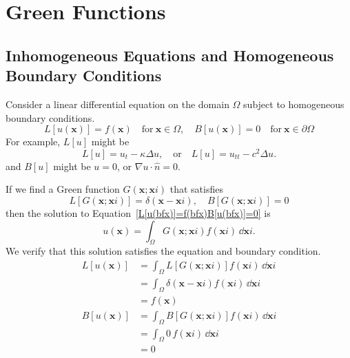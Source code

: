 \flushbottom




\chapter{Green Functions}




\section{Inhomogeneous Equations and Homogeneous Boundary Conditions}

Consider a linear differential equation on the domain $\Omega$
subject to homogeneous boundary conditions.
\begin{equation}
  \label{L[u(bfx)]=f(bfx)B[u(bfx)]=0}
  L[u(\mathbf{x})] = f(\mathbf{x}) \quad \mathrm{for}\ \mathbf{x} \in \Omega, \quad
  B[u(\mathbf{x})] = 0 \quad \mathrm{for}\ \mathbf{x} \in \partial \Omega
\end{equation}
For example, $L[u]$ might be
\[ 
L[u] = u_t - \kappa \Delta u, \quad \mathrm{or} \quad
L[u] = u_{t t} - c^2 \Delta u.
\]
and $B[u]$ might be $u = 0$, or $\nabla u \cdot \hat{n} = 0$.


If we find a Green function $G(\mathbf{x}; \mathbf{x}i)$ that satisfies
\[ 
L[G(\mathbf{x};\mathbf{x}i)] = \delta(\mathbf{x}-\mathbf{x}i), \quad 
B[G(\mathbf{x};\mathbf{x}i)] = 0
\]
then the solution to Equation~\ref{L[u(bfx)]=f(bfx)B[u(bfx)]=0} is
\[ 
u(\mathbf{x}) = \int_\Omega G(\mathbf{x};\mathbf{x}i) f(\mathbf{x}i)\,\dd \mathbf{x}i. 
\]
We verify that this solution satisfies the equation and boundary condition.
\begin{align*}
  L[u(\mathbf{x})]   &= \int_\Omega L[G(\mathbf{x};\mathbf{x}i)] f(\mathbf{x}i)\,\dd \mathbf{x}i \\
  &= \int_\Omega \delta(\mathbf{x}-\mathbf{x}i) f(\mathbf{x}i)\,\dd \mathbf{x}i \\
  &= f(\mathbf{x}) \\
  B[u(\mathbf{x})] &= \int_\Omega B[G(\mathbf{x};\mathbf{x}i)] f(\mathbf{x}i)\,\dd \mathbf{x}i \\
  &= \int_\Omega 0\,f(\mathbf{x}i)\,\dd \mathbf{x}i \\
  &= 0
\end{align*}









